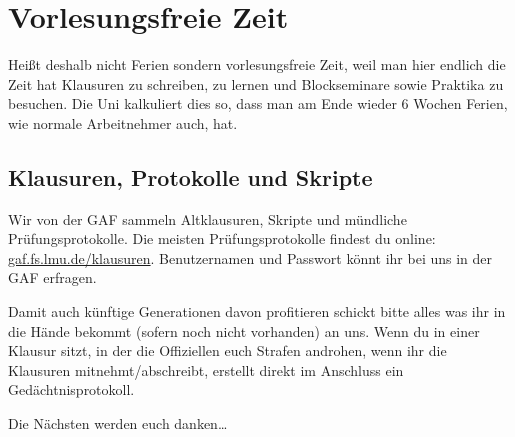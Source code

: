 ﻿
\chapter{Vorlesungsfreie Zeit}

Heißt deshalb nicht Ferien sondern vorlesungsfreie Zeit, weil man hier endlich die Zeit hat Klausuren zu schreiben, zu lernen und Blockseminare sowie Praktika zu besuchen. Die Uni kalkuliert dies so, dass man am Ende wieder 6 Wochen Ferien, wie normale Arbeitnehmer auch, hat.

\section{Klausuren, Protokolle und Skripte}
Wir von der GAF sammeln Altklausuren, Skripte und mündliche Prüfungsprotokolle. Die meisten Prüfungsprotokolle findest du online: \url{gaf.fs.lmu.de/klausuren}. Benutzernamen und Passwort könnt ihr bei uns in der GAF erfragen.

Damit auch künftige Generationen davon profitieren schickt bitte alles
was ihr in die Hände bekommt (sofern noch nicht vorhanden) an uns.
Wenn du in einer Klausur sitzt, in der die Offiziellen euch Strafen
androhen, wenn ihr die Klausuren mitnehmt/abschreibt, erstellt
direkt im Anschluss ein Gedächtnisprotokoll.

Die Nächsten werden euch danken\ldots

